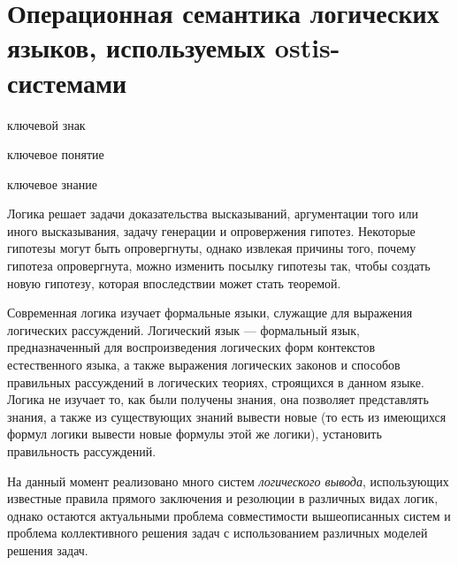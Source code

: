 \section{Операционная семантика логических языков, используемых ostis-системами}
\label{logic_lang_os}

\begin{SCn}
	\begin{scnrelfromlist}{ключевой знак}
	\end{scnrelfromlist}
\end{SCn}

\begin{SCn}
	\begin{scnrelfromlist}{ключевое понятие}
	\end{scnrelfromlist}
\end{SCn}

\bigskip

\begin{SCn}
	\begin{scnrelfromlist}{ключевое знание}
	\end{scnrelfromlist}
\end{SCn}

\bigskip

Логика решает задачи доказательства высказываний, аргументации того или иного высказывания, задачу генерации и опровержения гипотез. Некоторые гипотезы могут быть опровергнуты, однако извлекая причины того, почему гипотеза опровергнута, можно изменить посылку гипотезы так, чтобы создать новую гипотезу, которая впоследствии может стать теоремой.

Современная логика изучает формальные языки, служащие для выражения логических рассуждений. Логический язык — формальный язык, предназначенный для воспроизведения логических форм контекстов естественного языка, а также выражения логических законов и способов правильных рассуждений в логических теориях, строящихся в данном языке. Логика не изучает то, как были получены знания, она позволяет представлять знания, а также из существующих знаний вывести новые (то есть из имеющихся формул логики вывести новые формулы этой же логики), установить правильность рассуждений.

На данный момент реализовано много систем \textit{логического вывода}, использующих известные правила прямого заключения и резолюции в различных видах логик, однако остаются актуальными проблема совместимости вышеописанных систем и проблема коллективного решения задач с использованием различных моделей решения задач.

